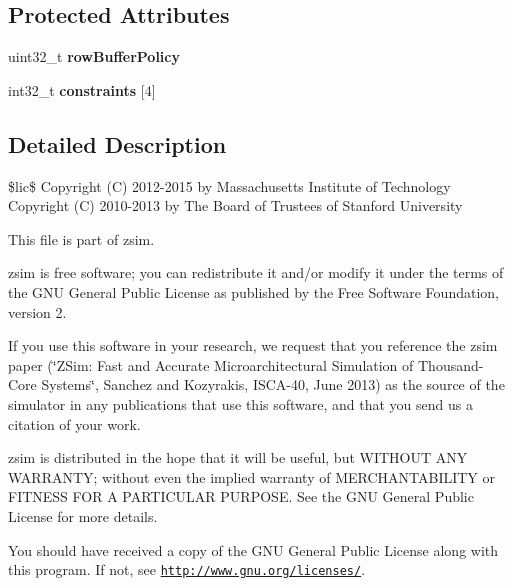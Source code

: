\subsection*{Protected Attributes}
\begin{DoxyCompactItemize}
\item 
\hypertarget{classMemParam_a21aaca927f0ee13304d5895782a02ba1}{uint32\-\_\-t {\bfseries row\-Buffer\-Policy}}\label{classMemParam_a21aaca927f0ee13304d5895782a02ba1}

\item 
\hypertarget{classMemParam_ab6d24a2e8c02068f5a7390f4d97a1e2f}{int32\-\_\-t {\bfseries constraints} \mbox{[}4\mbox{]}}\label{classMemParam_ab6d24a2e8c02068f5a7390f4d97a1e2f}

\end{DoxyCompactItemize}


\subsection{Detailed Description}
\$lic\$ Copyright (C) 2012-\/2015 by Massachusetts Institute of Technology Copyright (C) 2010-\/2013 by The Board of Trustees of Stanford University

This file is part of zsim.

zsim is free software; you can redistribute it and/or modify it under the terms of the G\-N\-U General Public License as published by the Free Software Foundation, version 2.

If you use this software in your research, we request that you reference the zsim paper (\char`\"{}\-Z\-Sim\-: Fast and Accurate Microarchitectural Simulation of
\-Thousand-\/\-Core Systems\char`\"{}, Sanchez and Kozyrakis, I\-S\-C\-A-\/40, June 2013) as the source of the simulator in any publications that use this software, and that you send us a citation of your work.

zsim is distributed in the hope that it will be useful, but W\-I\-T\-H\-O\-U\-T A\-N\-Y W\-A\-R\-R\-A\-N\-T\-Y; without even the implied warranty of M\-E\-R\-C\-H\-A\-N\-T\-A\-B\-I\-L\-I\-T\-Y or F\-I\-T\-N\-E\-S\-S F\-O\-R A P\-A\-R\-T\-I\-C\-U\-L\-A\-R P\-U\-R\-P\-O\-S\-E. See the G\-N\-U General Public License for more details.

You should have received a copy of the G\-N\-U General Public License along with this program. If not, see \href{http://www.gnu.org/licenses/}{\tt http\-://www.\-gnu.\-org/licenses/}. 

